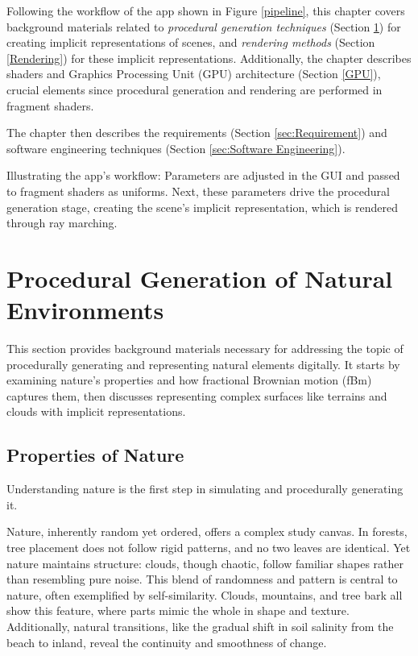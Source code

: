 \label{sec:Preparation}

Following the workflow of the app shown in Figure \ref{pipeline}, this chapter covers background materials related to \textit{procedural generation techniques} (Section \ref{Procedural Generation}) for creating implicit representations of scenes, and \textit{rendering methods} (Section \ref{Rendering}) for these implicit representations. Additionally, the chapter describes shaders and Graphics Processing Unit (GPU) architecture (Section \ref{GPU}), crucial elements since procedural generation and rendering are performed in fragment shaders.

The chapter then describes the requirements (Section \ref{sec:Requirement}) and software engineering techniques (Section \ref{sec:Software Engineering}).


{
Illustrating the app's workflow: Parameters are adjusted in the GUI and passed to fragment shaders as uniforms. Next, these parameters drive the procedural generation stage, creating the scene's implicit representation, which is rendered through ray marching.}


\section{Procedural Generation of Natural Environments}
\label{Procedural Generation}

This section provides background materials necessary for addressing the topic of procedurally generating and representing natural elements digitally. It starts by examining nature's properties and how fractional Brownian motion (fBm) captures them, then discusses representing complex surfaces like terrains and clouds with implicit representations.

\subsection{Properties of Nature}
\label{Properties of Nature}

Understanding nature is the first step in simulating and procedurally generating it.

Nature, inherently random yet ordered, offers a complex study canvas. In forests, tree placement does not follow rigid patterns, and no two leaves are identical. Yet nature maintains structure: clouds, though chaotic, follow familiar shapes rather than resembling pure noise. This blend of randomness and pattern is central to nature, often exemplified by self-similarity. Clouds, mountains, and tree bark all show this feature, where parts mimic the whole in shape and texture. Additionally, natural transitions, like the gradual shift in soil salinity from the beach to inland, reveal the continuity and smoothness of change.

